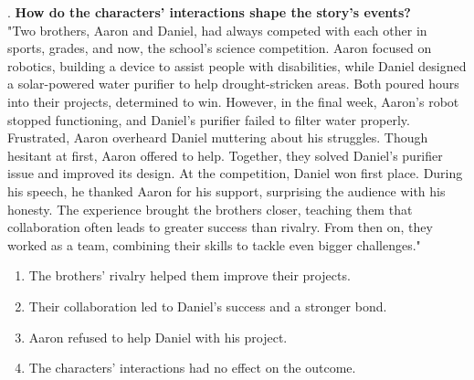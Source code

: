 \documentclass[12pt]{article}
\begin{document}
\vspace{1cm}
. \textbf{How do the characters' interactions shape the story’s events?\\}
"Two brothers, Aaron and Daniel, had always competed with each other in sports, grades, and now, the school’s science competition. Aaron focused on robotics, building a device to assist people with disabilities, while Daniel designed a solar-powered water purifier to help drought-stricken areas. Both poured hours into their projects, determined to win. However, in the final week, Aaron’s robot stopped functioning, and Daniel’s purifier failed to filter water properly. Frustrated, Aaron overheard Daniel muttering about his struggles. Though hesitant at first, Aaron offered to help. Together, they solved Daniel’s purifier issue and improved its design. At the competition, Daniel won first place. During his speech, he thanked Aaron for his support, surprising the audience with his honesty. The experience brought the brothers closer, teaching them that collaboration often leads to greater success than rivalry. From then on, they worked as a team, combining their skills to tackle even bigger challenges."  
\begin{enumerate}[label=\Alph*.]
    \item The brothers' rivalry helped them improve their projects.  
    \item Their collaboration led to Daniel’s success and a stronger bond.  
    \item Aaron refused to help Daniel with his project.  
    \item The characters’ interactions had no effect on the outcome.  
\end{enumerate}

\vspace{1cm}
\end{document}
